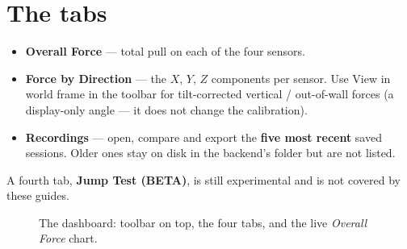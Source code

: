 \documentclass[11pt,a4paper]{article}
\begin{document}
\section{The tabs}
\begin{itemize}
  \item \textbf{Overall Force} --- total pull on each of the four sensors.
  \item \textbf{Force by Direction} --- the $X$, $Y$, $Z$ components per sensor.
        Use \textsf{View in world frame} in the toolbar for tilt-corrected
        vertical / out-of-wall forces (a display-only angle --- it does not change
        the calibration).
  \item \textbf{Recordings} --- open, compare and export the \textbf{five most
        recent} saved sessions. Older ones stay on disk in the backend's
         folder but are not listed.
\end{itemize}
A fourth tab, \textbf{Jump Test (BETA)}, is still experimental and is not covered
by these guides.

\begin{figure}[h]\centering
{}
\caption{The dashboard: toolbar on top, the four tabs, and the live
\emph{Overall Force} chart.}
\end{figure}
\end{document}
